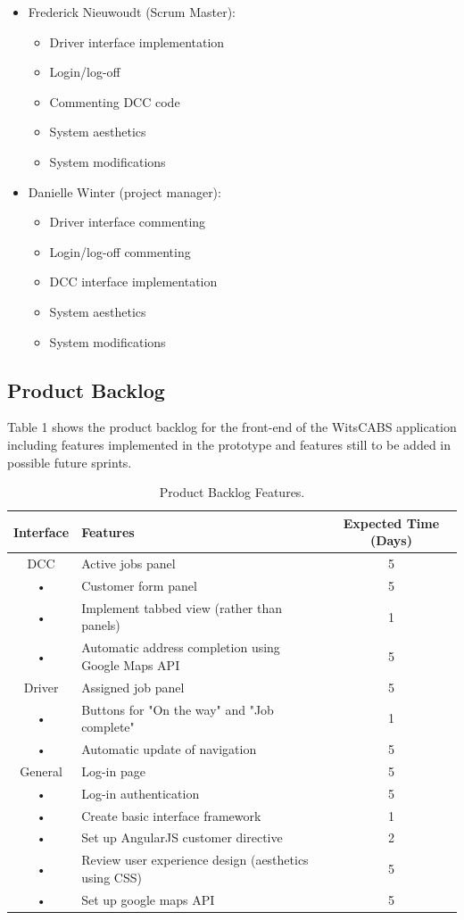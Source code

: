 \documentclass[12pt]{article}
\begin{document}
\begin{itemize}
\item Frederick Nieuwoudt (Scrum Master):
\begin{itemize}
\item Driver interface implementation
\item Login/log-off
\item Commenting DCC code
\item System aesthetics
\item System modifications
\end{itemize}
\item Danielle Winter (project manager):
\begin{itemize}
\item Driver interface commenting
\item Login/log-off commenting
\item DCC interface implementation
\item System aesthetics
\item System modifications
\end{itemize}
\end{itemize}

\subsection{Product Backlog}
Table 1 shows the product backlog for the front-end of the WitsCABS application including features implemented in the prototype and features still to be added in possible future sprints.\\
\begin{table}[htb]
    \caption{Product Backlog Features.\label{tab:fonts}}
    \begin{center}
\begin{tabular}{|c|l|c|}
\hline 
Interface & Features & Expected Time (Days)\\ 
\hline 
DCC & Active jobs panel & 5\\ 
• & Customer form panel & 5\\ 
• & Implement tabbed view (rather than panels) & 1 \\
• & Automatic address completion using Google Maps API & 5\\

\hline 
Driver & Assigned job panel & 5\\
• & Buttons for "On the way" and "Job complete" & 1\\ 
• & Automatic update of navigation & 5\\
\hline 
General & Log-in page & 5\\ 
• & Log-in authentication & 5\\
• & Create basic interface framework & 1\\
• & Set up AngularJS customer directive & 2\\
• & Review user experience design (aesthetics using CSS) & 5\\
• & Set up google maps API & 5\\
\hline
\end{tabular} 
\end{center}
\end{table}
\end{document}
